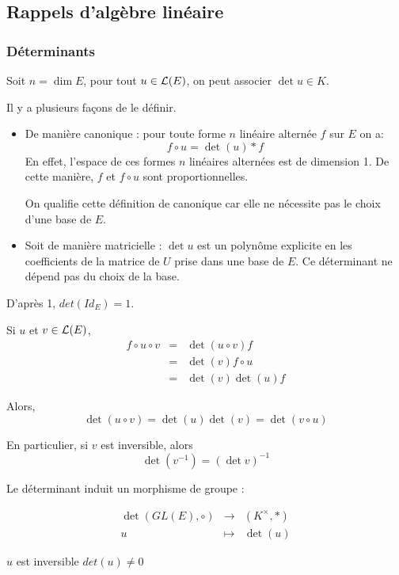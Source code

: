 \subsection{Rappels d'algèbre linéaire}

\subsubsection{Déterminants} %


Soit $n = \dim E$, pour tout $u \in \mathcal{L}(E)$, on peut associer $\det u \in K$.

Il y a plusieurs façons de le définir.


\begin{itemize}
	\item De manière canonique : pour toute forme $n$ linéaire alternée $f$ sur $E$ on a:
	      $$ f \circ u = \det (u) * f$$
	      En effet, l'espace de ces formes $n$ linéaires alternées est de dimension 1. De cette manière, $f$ et $f \circ u$ sont proportionnelles.

	      On qualifie cette définition de canonique car elle ne nécessite pas le choix d'une base de $E$.

	\item Soit de manière matricielle : $\det u$ est un polynôme explicite en les coefficients de la matrice de $U$ prise dans une base de $E$.
	      Ce déterminant ne dépend pas du choix de la base.
\end{itemize}


D'après 1, $det (Id_E) = 1$.

Si $u$ et $v \in \mathcal{L}(E)$,
\begin{eqnarray*}
	f \circ u \circ v &=& \det (u \circ v) f \\
	&=& \det (v) f  \circ u \\
	&=& \det (v) \det (u) f
\end{eqnarray*}

Alors,
$$\det (u \circ v) = \det (u) \det (v) = \det (v \circ u) $$

En particulier, si $v$ est inversible, alors
$$ \det (v^{-1}) = (\det v )^{-1} $$

Le déterminant induit un morphisme de groupe :


\begin{eqnarray*}
	\det (GL(E), \circ) &\to& (K^{\times}, *)\\
	u &\mapsto& \det (u)
\end{eqnarray*}

$u$ est inversible \ssi $det(u) \neq 0$

